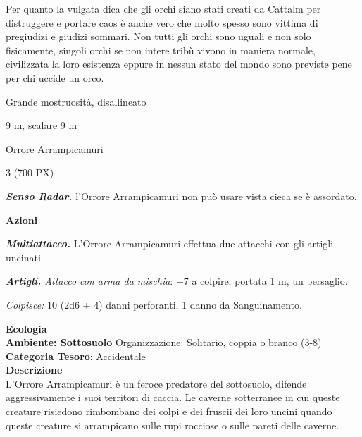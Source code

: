 \begin{multicols}{2}
{Per quanto la vulgata dica che gli orchi siano stati creati da Cattalm per distruggere e portare caos è anche vero che molto spesso sono vittima di pregiudizi e giudizi sommari. Non tutti gli orchi sono uguali e non solo fisicamente, singoli orchi se non intere tribù vivono in maniera normale, civilizzata la loro esistenza eppure in nessun stato del mondo sono previste pene per chi uccide un orco.

\begin{description}[noitemsep, topsep=0pt, parsep=0pt, partopsep=0pt, itemsep=1pt, leftmargin=2.35cm,  labelwidth=2.2cm, itemindent=0cm, listparindent=0pt] %
\setlength{\baselineskip}{10pt}
\item[\textbf{Taglia/Tipo}] Grande mostruosità, disallineato
\item[\textbf{Caratt.}] 
\item[\textbf{Punti Ferita}] 
\item[\textbf{Movimento}] 9 m, scalare 9 m
\item[\textbf{Tiri Salvez.}] 
\item[\textbf{Sensi}] 
\item[\textbf{Linguaggi}] Orrore Arrampicamuri
\item[\textbf{Sfida}] 3 (700 PX)
\end{description}
\smallskip

\emph{\textbf{Senso Radar.}} l'Orrore Arrampicamuri non può usare vista cieca se è assordato.

\textbf{Azioni}

\emph{\textbf{Multiattacco.}} L'Orrore Arrampicamuri effettua due attacchi con gli artigli uncinati.

\emph{\textbf{Artigli.} Attacco con arma da mischia}: +7 a colpire, portata 1 m, un bersaglio.

\emph{Colpisce:} 10 (2d6 + 4) danni perforanti, 1 danno da Sanguinamento.

\textbf{Ecologia}\\
\textbf{Ambiente: Sottosuolo}
Organizzazione: Solitario, coppia o branco (3-8)\\
\textbf{Categoria Tesoro}: Accidentale\\
\textbf{Descrizione}\\
L'Orrore Arrampicamuri è un feroce predatore del sottosuolo, difende aggressivamente i suoi territori di caccia. Le caverne sotterranee in cui queste creature risiedono rimbombano dei colpi e dei fruscii dei loro uncini quando queste creature si arrampicano sulle rupi rocciose o sulle pareti delle caverne.

}
\end{multicols}
